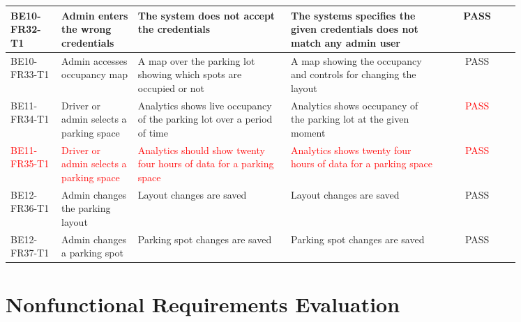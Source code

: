 \documentclass[12pt, titlepage]{article}
\begin{document}
\begin{center}
\begin{tabular}{|p{0.10\linewidth}|p{0.15\linewidth}|p{0.30\linewidth}|p{0.30\linewidth}|c|} 
\hline
BE10-FR32-T1 & Admin enters the wrong credentials & The system does not accept
the credentials & The systems specifies the given credentials does not match any
admin user & \textcolor{OliveGreen}{PASS} \\ 
\hline
BE10-FR33-T1 & Admin accesses occupancy map & A map over the parking lot showing
which spots are occupied or not & A map showing the occupancy and controls for
changing the layout & \textcolor{OliveGreen}{PASS} \\ 
\hline
BE11-FR34-T1 & Driver or admin selects a parking space & Analytics shows live
occupancy of the parking lot over a period of time & Analytics shows occupancy
of the parking lot at the given moment & \textcolor{red}{PASS} \\ 
\hline
\textcolor{red}{BE11-FR35-T1} & \textcolor{red}{Driver or admin selects a
parking space} & \textcolor{red}{Analytics should show twenty four hours of data
for a parking space} & \textcolor{red}{Analytics shows twenty four hours of data
for a parking space} & \textcolor{red}{PASS} \\ 
\hline
BE12-FR36-T1 & Admin changes the parking layout & Layout changes are saved &
Layout changes are saved & \textcolor{OliveGreen}{PASS} \\ 
\hline
BE12-FR37-T1 & Admin changes a parking spot & Parking spot changes are saved &
Parking spot changes are saved & \textcolor{OliveGreen}{PASS} \\ 
\hline
\end{tabular}
\end{center}

\pagebreak

\section{Nonfunctional Requirements Evaluation}
\end{document}
